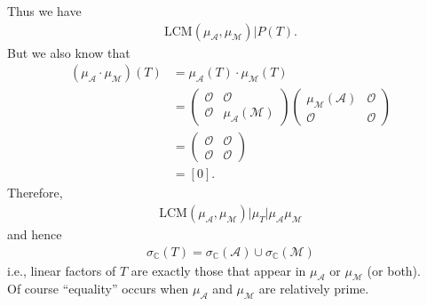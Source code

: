 \documentclass{book}
\theoremstyle{definition}
\newcommand{\A}{\mathcal{A}}
\newcommand{\M}{\mathcal{M}}
\begin{document}
Thus we have 
\begin{align*}
\text{LCM}(\mu_\A,\mu_\M) \big\vert P(T).
\end{align*}
But we also know that 
\begin{align*}
(\mu_\A \cdot \mu_\M)(T) &= \mu_\A (T) \cdot \mu_\M(T)\\
&= \begin{pmatrix}
\mathcal{O} & \mathcal{O}\\
\mathcal{O} & \mu_\A(\M)
\end{pmatrix}
\begin{pmatrix}
\mu_\M(\A) & \mathcal{O}\\
\mathcal{O} & \mathcal{O}
\end{pmatrix}\\
&=
\begin{pmatrix}
\mathcal{O} & \mathcal{O}\\
\mathcal{O} & \mathcal{O}
\end{pmatrix}\\
&= [0].
\end{align*}
Therefore,
\begin{align*}
\boxed{\text{LCM}(\mu_\A, \mu_\M) \big\vert \mu_T \big\vert \mu_\A \mu_\M}
\end{align*}
and hence
\begin{align*}
\boxed{\sigma_{\mathbb{C}}(T) =  \sigma_{\mathbb{C}}(\A) \cup \sigma_{\mathbb{C}}(\M)  }
\end{align*}
i.e., linear factors of $T$ are exactly those that appear in $\mu_\A$ or $\mu_\M$ (or both). \\

Of course ``equality'' occurs when $\mu_\A$ and $\mu_\M$ are relatively prime. 
\end{document}
